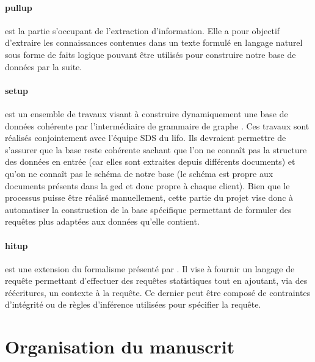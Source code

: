 \paragraph{\gls{pullup}} est la partie s'occupant de l'extraction d'information.
Elle a pour objectif d'extraire les connaissances contenues dans un texte formulé en langage naturel sous forme de faits logique pouvant être utilisés pour construire notre base de données par la suite.

\paragraph{\gls{setup}} est un ensemble de travaux visant à construire dynamiquement une base de données cohérente par l'intermédiaire de grammaire de graphe \cite{chabin_using_2019}.
Ces travaux sont réalisés conjointement avec l'équipe SDS du \gls{lifo}.
Ils devraient permettre de s'assurer que la base reste cohérente sachant que l'on ne connaît pas la structure des données en entrée (car elles sont extraites depuis différents documents) et qu'on ne connaît pas le schéma de notre base (le schéma est propre aux documents présents dans la \gls{ged} et donc propre à chaque client).
Bien que le processus puisse être réalisé manuellement, cette partie du projet vise donc à automatiser la construction de la base spécifique permettant de formuler des requêtes plus adaptées aux données qu'elle contient.

\paragraph{\gls{hitup}} est une extension du formalisme présenté par \cite{chabin_context-driven_2018}.
Il vise à fournir un langage de requête permettant d'effectuer des requêtes statistiques tout en ajoutant, via des réécritures, un contexte à la requête.
Ce dernier peut être composé de contraintes d'intégrité ou de règles d'inférence utilisées pour spécifier la requête.

\section{Organisation du manuscrit}
